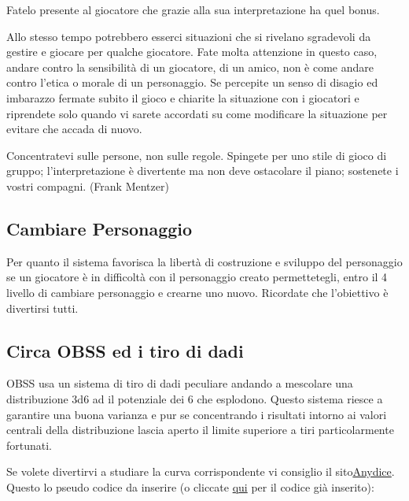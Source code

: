\begin{multicols}{2}
\medskip

Fatelo presente al giocatore che grazie alla sua interpretazione ha quel bonus.

Allo stesso tempo potrebbero esserci situazioni che si rivelano sgradevoli da gestire e giocare per qualche giocatore. Fate molta attenzione in questo caso, andare contro la sensibilità di un giocatore, di un amico, non è come andare contro l'etica o morale di un personaggio. Se percepite un senso di disagio ed imbarazzo fermate subito il gioco e chiarite la situazione con i giocatori e riprendete solo quando vi sarete accordati su come modificare la situazione per evitare che accada di nuovo.

\begin{changemargin}{0.3cm}{0.3cm}\begin{enfasi}
{Concentratevi sulle persone, non sulle regole. Spingete per uno stile di gioco di gruppo; l'interpretazione è divertente ma non deve ostacolare il piano; sostenete i vostri compagni. (Frank Mentzer)}\end{enfasi}\end{changemargin}

\subsection{Cambiare Personaggio}

Per quanto il sistema favorisca la libertà di costruzione e sviluppo del personaggio se un giocatore è in difficoltà con il personaggio creato permettetegli, entro il 4 livello di cambiare personaggio e crearne uno nuovo. Ricordate che l'obiettivo è divertirsi tutti.

\subsection{Circa OBSS ed i tiro di dadi}\label{obssedadi}

OBSS usa un sistema di tiro di dadi peculiare andando a mescolare una distribuzione 3d6 ad il potenziale dei 6 che esplodono. Questo sistema riesce a garantire una buona varianza e pur se concentrando i risultati intorno ai valori centrali della distribuzione lascia aperto il limite superiore a tiri particolarmente fortunati.

Se volete divertirvi a studiare la curva corrispondente vi consiglio il sito\href{https://anydice.com/}{Anydice}. Questo lo pseudo codice da inserire (o cliccate \href{https://anydice.com/program/2610e}{qui} per il codice già inserito):


\end{multicols}
